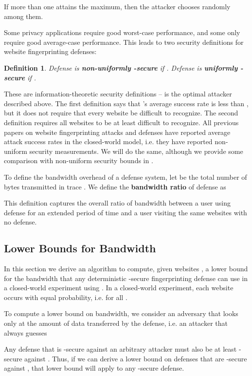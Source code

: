 \documentclass[10pt,journal]{IEEEtran}
\newtheorem{definition}{Definition}
\begin{document}
If more than one  attains the maximum, then the attacker chooses
randomly among them.

Some privacy applications require good worst-case performance, and
some only require good average-case performance.  This leads to two
security definitions for website fingerprinting defenses:
\begin{definition}
  Defense  is \textbf{non-uniformly -secure} if
  .  Defense  is
  \textbf{uniformly -secure} if
  .
\end{definition}
These are information-theoretic security definitions --  is the
optimal attacker described above.  The first definition says that
's average success rate is less than , but it does not
require that every website be difficult to recognize.  The second
definition requires all websites to be at least  difficult
to recognize.  All previous papers on website fingerprinting attacks
and defenses have reported average attack success rates in the
closed-world model, i.e. they have reported non-uniform security
measurements.  We will do the same, although we provide some
comparison with non-uniform security bounds in
.

To define the bandwidth overhead of a defense system, let  be the
total number of bytes transmitted in trace .  We define the
\textbf{bandwidth ratio} of defense  as

This definition captures the overall ratio of bandwidth between a user
using defense  for an extended period of time and a user visiting
the same websites with no defense.  


\subsection{Lower Bounds for Bandwidth}\label{subsec:lower_bounds}
In this section we derive an algorithm to compute, given websites
, a lower bound for the bandwidth that any
deterministic -secure fingerprinting defense can use in
a closed-world experiment using .  In a closed-world
experiment, each website occurs with equal probability,
i.e.  for all .

To compute a lower bound on bandwidth, we consider an adversary
that looks only at the amount of data transferred by the defense,
i.e. an attacker  that always guesses

Any defense that is -secure against an arbitrary attacker
must also be at least -secure against .  Thus, if we
can derive a lower bound on defenses that are -secure
against , that lower bound will apply to any -secure
defense.
\end{document}
